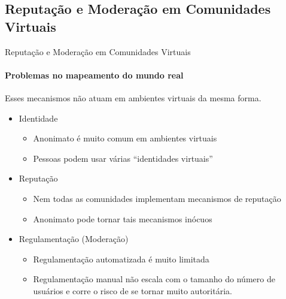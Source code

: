 \documentclass[compress]{beamer}
\begin{document}
\subsection{Reputação e Moderação em Comunidades Virtuais}

    \begin{frame}{Reputação e Moderação em Comunidades Virtuais}
    \framesubtitle{Problemas no mapeamento do mundo real}
	Esses mecanismos não atuam em ambientes virtuais da
	mesma forma.
	\begin{itemize}
	    \item Identidade \pause
	        \begin{itemize}
                    \item Anonimato é muito comum em ambientes virtuais

		    \item Pessoas podem usar várias ``identidades
                    virtuais''
		\end{itemize}
	    \pause

	    \item Reputação \pause
	        \begin{itemize}
                    \item Nem todas as comunidades implementam
		    mecanismos de reputação

                    \item Anonimato pode tornar tais mecanismos inócuos
		\end{itemize}
	    \pause

	    \item Regulamentação (Moderação) \pause
	        \begin{itemize}
		    \item Regulamentação automatizada é muito limitada

		    \item Regulamentação manual não escala com o tamanho
		    do número de usuários e corre o risco de se tornar
		    muito autoritária.
		\end{itemize}
	\end{itemize}
    \end{frame}
\end{document}
